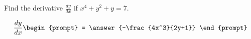 \documentclass{ximera}
\author{Gregory Hartman \and Matthew Carr}
\begin{document}
\begin{exercise}



Find the derivative $\frac{dy}{dx}$ if $x^4+y^2+y=7$.

\[
\frac{dy}{dx}
\begin{prompt}
= \answer{-\frac{4x^3}{2y+1}}
\end{prompt}
\]

\end{exercise}
\end{document}
